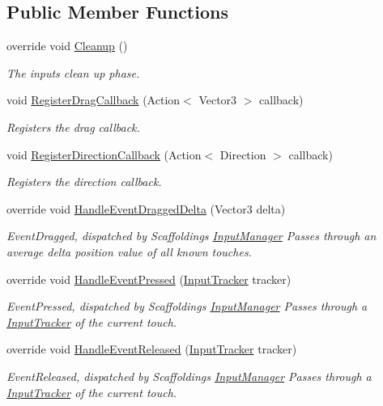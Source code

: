 \subsection*{Public Member Functions}
\begin{DoxyCompactItemize}
\item 
override void \hyperlink{class_scaffolding_1_1_drag_input_aff15e6ed3bca67228c44918a544e241b}{Cleanup} ()
\begin{DoxyCompactList}\small\item\em The inputs clean up phase. \end{DoxyCompactList}\item 
void \hyperlink{class_scaffolding_1_1_drag_input_aa14faf0a305db966f957bb59ab5de1ff}{Register\-Drag\-Callback} (Action$<$ Vector3 $>$ callback)
\begin{DoxyCompactList}\small\item\em Registers the drag callback. \end{DoxyCompactList}\item 
void \hyperlink{class_scaffolding_1_1_drag_input_a5f46ef8ef277a59f91ce14eb725af851}{Register\-Direction\-Callback} (Action$<$ Direction $>$ callback)
\begin{DoxyCompactList}\small\item\em Registers the direction callback. \end{DoxyCompactList}\item 
override void \hyperlink{class_scaffolding_1_1_drag_input_a600650eb9b2e3ce954af6a5982db3360}{Handle\-Event\-Dragged\-Delta} (Vector3 delta)
\begin{DoxyCompactList}\small\item\em Event\-Dragged, dispatched by Scaffoldings \hyperlink{class_scaffolding_1_1_input_manager}{Input\-Manager} Passes through an average delta position value of all known touches. \end{DoxyCompactList}\item 
override void \hyperlink{class_scaffolding_1_1_drag_input_a49561ec761c72584711384d57cb74f41}{Handle\-Event\-Pressed} (\hyperlink{class_scaffolding_1_1_input_tracker}{Input\-Tracker} tracker)
\begin{DoxyCompactList}\small\item\em Event\-Pressed, dispatched by Scaffoldings \hyperlink{class_scaffolding_1_1_input_manager}{Input\-Manager} Passes through a \hyperlink{class_scaffolding_1_1_input_tracker}{Input\-Tracker} of the current touch. \end{DoxyCompactList}\item 
override void \hyperlink{class_scaffolding_1_1_drag_input_ab50a7059961c803e39e3ce9ffb0945d7}{Handle\-Event\-Released} (\hyperlink{class_scaffolding_1_1_input_tracker}{Input\-Tracker} tracker)
\begin{DoxyCompactList}\small\item\em Event\-Released, dispatched by Scaffoldings \hyperlink{class_scaffolding_1_1_input_manager}{Input\-Manager} Passes through a \hyperlink{class_scaffolding_1_1_input_tracker}{Input\-Tracker} of the current touch. \end{DoxyCompactList}\end{DoxyCompactItemize}
